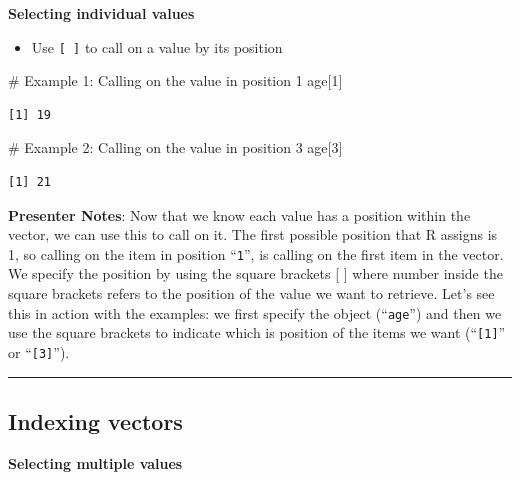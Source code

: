 \documentclass[
  letterpaper,
  DIV=11,
  numbers=noendperiod]{scrartcl}
\newenvironment{Shaded}{\begin{snugshade}}{\end{snugshade}}
\newcommand{\CommentTok}[1]{\textcolor[rgb]{0.37,0.37,0.37}{#1}}
\newcommand{\DecValTok}[1]{\textcolor[rgb]{0.68,0.00,0.00}{#1}}
\newcommand{\NormalTok}[1]{\textcolor[rgb]{0.00,0.23,0.31}{#1}}
\providecommand{\tightlist}{%
  \setlength{\itemsep}{0pt}\setlength{\parskip}{0pt}}
\begin{document}
\textbf{Selecting individual values}

\begin{itemize}
\tightlist
\item
  Use \texttt{{[}\ {]}} to call on a value by its position
\end{itemize}

\begin{Shaded}
\begin{Highlighting}[]
\CommentTok{\# Example 1: Calling on the value in position 1 }
\NormalTok{age[}\DecValTok{1}\NormalTok{]}
\end{Highlighting}
\end{Shaded}

\begin{verbatim}
[1] 19
\end{verbatim}

\begin{Shaded}
\begin{Highlighting}[]
\CommentTok{\# Example 2: Calling on the value in position 3}
\NormalTok{age[}\DecValTok{3}\NormalTok{]}
\end{Highlighting}
\end{Shaded}

\begin{verbatim}
[1] 21
\end{verbatim}

\textbf{Presenter Notes}: Now that we know each value has a position
within the vector, we can use this to call on it. The first possible
position that R assigns is 1, so calling on the item in position
``\texttt{1}'', is calling on the first item in the vector. We specify
the position by using the square brackets {[} {]} where number inside
the square brackets refers to the position of the value we want to
retrieve. Let's see this in action with the examples: we first specify
the object (``\texttt{age}'') and then we use the square brackets to
indicate which is position of the items we want (``\texttt{{[}1{]}}'' or
``\texttt{{[}3{]}}'').

\begin{center}\rule{0.5\linewidth}{0.5pt}\end{center}

\subsection{Indexing vectors}\label{indexing-vectors-2}

\textbf{Selecting multiple values}
\end{document}
